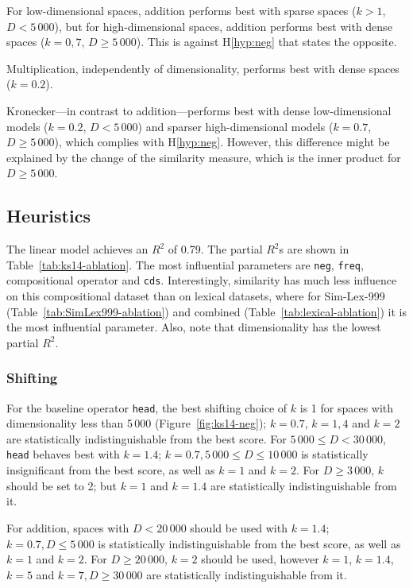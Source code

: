 For low-dimensional spaces, addition performs best with sparse spaces ($k > 1$, $D < 5\,000$), but for high-dimensional spaces, addition performs best  with dense spaces ($k = 0,7$, $D \geq 5\,000$). This is against H\ref{hyp:neg} that states the opposite.

Multiplication, independently of dimensionality, performs best with dense spaces ($k = 0.2$).

Kronecker---in contrast to addition---performs best with dense low-dimensional models ($k = 0.2$, $D < 5\,000$) and sparser high-dimensional models ($k = 0.7$, $D \geq 5\,000$), which complies with H\ref{hyp:neg}. However, this difference might be explained by the change of the similarity measure, which is the inner product for $D \geq 5\,000$.

\subsection{Heuristics}
\label{sec:heuristics}



The linear model achieves an $R^2$ of 0.79. The partial $R^2$s are shown in Table~\ref{tab:ks14-ablation}. The most influential parameters are \texttt{neg}, \texttt{freq}, compositional operator and \texttt{cds}. Interestingly, similarity has much less influence on this compositional dataset than on lexical datasets, where for Sim-Lex-999 (Table~\ref{tab:SimLex999-ablation}) and combined (Table~\ref{tab:lexical-ablation}) it is the most influential parameter. Also, note that dimensionality has the lowest partial $R^2$.

\subsubsection{Shifting}

For the baseline operator \texttt{head}, the best shifting choice of $k$ is 1 for spaces with dimensionality less than 5\,000 (Figure~\ref{fig:ks14-neg}); $k=0.7$, $k=1,4$ and $k=2$ are statistically indistinguishable from the best score. For $5\,000 \leq D < 30\,000$, \texttt{head} behaves best with $k = 1.4$; $k=0.7, 5\,000 \le D \le 10\,000$ is statistically insignificant from the best score, as well as $k=1$ and $k=2$. For $D \geq 3\,000$, $k$ should be set to 2; but $k=1$ and $k=1.4$ are statistically indistinguishable from it.

For addition, spaces with $D < 20\,000$ should be used with $k = 1.4$; $k=0.7, D \le 5\,000$ is statistically indistinguishable from the best score, as well as $k=1$ and $k=2$. For $D \ge 20\,000$, $k = 2$ should be used, however $k=1$, $k=1.4$, $k=5$ and $k=7, D \ge 30\,000$ are statistically indistinguishable from it.

